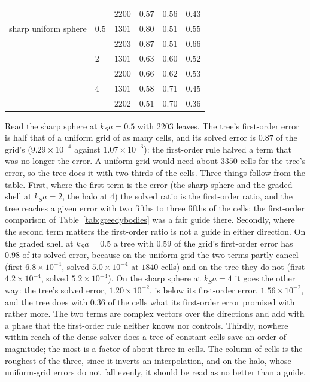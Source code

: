 \documentclass[11pt,a4paper]{article}
\begin{document}
\begin{table}[htbp]
\begin{tabular}{@{}llrccc@{}}
                           &       & $2200$ & $0.57$ & $0.56$ & $0.43$ \\
\midrule
sharp uniform sphere       & $0.5$ & $1301$ & $0.80$ & $0.51$ & $0.55$ \\
                           &       & $2203$ & $0.87$ & $0.51$ & $0.66$ \\
                           & $2$   & $1301$ & $0.63$ & $0.60$ & $0.52$ \\
                           &       & $2200$ & $0.66$ & $0.62$ & $0.53$ \\
                           & $4$   & $1301$ & $0.58$ & $0.71$ & $0.45$ \\
                           &       & $2202$ & $0.51$ & $0.70$ & $0.36$ \\
\bottomrule
\end{tabular}
\end{table}

Read the sharp sphere at $k_Sa=0.5$ with $2203$ leaves. The tree's first-order error is half that of a
uniform grid of as many cells, and its solved error is $0.87$ of the grid's ($9.29\times10^{-4}$ against
$1.07\times10^{-3}$): the first-order rule halved a term that was no longer the error. A uniform grid
would need about $3350$ cells for the tree's error, so the tree does it with two thirds of the cells.
Three things follow from the table. First, where the first term is the error (the sharp sphere and the
graded shell at $k_Sa=2$, the halo at $4$) the solved ratio is the first-order ratio, and the tree
reaches a given error with two fifths to three fifths of the cells; the first-order comparison of
Table~\ref{tab:greedybodies} was a fair guide there. Secondly, where the second term matters the
first-order ratio is not a guide in either direction. On the graded shell at $k_Sa=0.5$ a tree with
$0.59$ of the grid's first-order error has $0.98$ of its solved error, because on the uniform grid the
two terms partly cancel (first $6.8\times10^{-4}$, solved $5.0\times10^{-4}$ at $1840$ cells) and on the
tree they do not (first $4.2\times10^{-4}$, solved $5.2\times10^{-4}$). On the sharp sphere at
$k_Sa=4$ it goes the other way: the tree's solved error, $1.20\times10^{-2}$, is below its first-order
error, $1.56\times10^{-2}$, and the tree does with $0.36$ of the cells what its first-order error
promised with rather more. The two terms are complex vectors over the directions and add with a phase
that the first-order rule neither knows nor controls. Thirdly, nowhere within reach of the dense solver
does a tree of constant cells save an order of magnitude; the most is a factor of about three in cells. The
column of cells is the roughest of the three, since it inverts an interpolation, and on the halo, whose
uniform-grid errors do not fall evenly, it should be read as no better than a guide.
\end{document}
